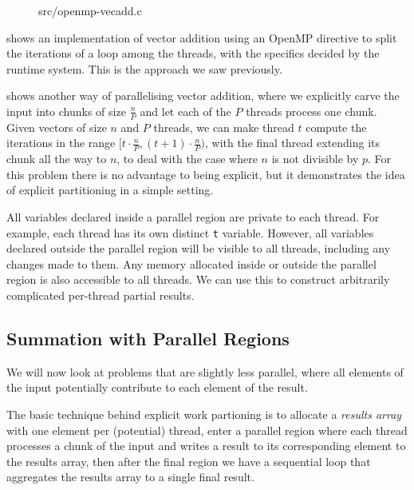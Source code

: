 \begin{figure}

{src/openmp-vecadd.c}
\end{figure}


 shows an implementation of vector
addition using an OpenMP directive to split the iterations of a loop
among the threads, with the specifics decided by the runtime system.
This is the approach we saw previously.

 shows another way of parallelising
vector addition, where we explicitly carve the input into chunks of
size $\frac{n}{P}$ and let each of the $P$ threads process one chunk.
Given vectors of size $n$ and $P$ threads, we can make thread $t$
compute the iterations in the range
$[t\cdot \frac{n}{P},(t+1)\cdot \frac{n}{P})$, with the final thread
extending its chunk all the way to $n$, to deal with the case where
$n$ is not divisible by $p$. For this problem there is no advantage to
being explicit, but it demonstrates the idea of explicit partitioning
in a simple setting.

All variables declared inside a parallel region are private to each
thread. For example, each thread has its own distinct \texttt{t}
variable. However, all variables declared outside the parallel region
will be visible to all threads, including any changes made to them.
Any memory allocated inside or outside the parallel region is also
accessible to all threads. We can use this to construct arbitrarily
complicated per-thread partial results.

\subsection{Summation with Parallel Regions}
\label{sec:parallel-summation}

We will now look at problems that are slightly less parallel, where
all elements of the input potentially contribute to each element of
the result.

The basic technique behind explicit work partioning is to allocate a
\emph{results array} with one element per (potential) thread, enter a
parallel region where each thread processes a chunk of the input and
writes a result to its corresponding element to the results array,
then after the final region we have a sequential loop that aggregates
the results array to a single final result.


